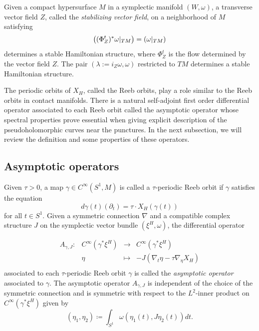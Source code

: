 \documentclass[11pt, a4paper]{amsart}
\let\ker\relax
\DeclareMathOperator{\ker}{Ker}
\begin{document}
\begin{example}\cite{HZ-Bookdynamics}\label{example: stabilizing vector field}
Given a compact hypersurface $M$ in a symplectic manifold $(W,\omega)$, a transverse vector field $Z$, called the \textit{stabilizing vector field}, on a neighborhood of $M$ satisfying
$$\ker \left((\Phi^t_Z)^*\omega|_{TM}\right)=\ker (\omega|_{TM}) $$
determines a stable Hamiltonian structure, where $\Phi^t_Z$ is the flow determined by the vector field $Z$. The pair $(\lambda:=i_{Z}\omega,\omega)$ restricted to $TM$ determines a stable Hamiltonian structure.
\end{example}

The periodic orbits of $X_H$, called the Reeb orbits, play a role similar to the Reeb orbits in contact manifolds. There is a natural self-adjoint first order differential operator associated to each Reeb orbit called the asymptotic operator whose spectral properties prove essential when giving explicit description of the pseudoholomorphic curves near the punctures. In the next subsection, we will review the definition and some properties of these operators.

\subsection{Asymptotic operators}\label{sec: Asymptotic operator}

Given $\tau>0$, a map $\gamma \in C^{\infty}(S^1 , M)$ is called a $\tau$-periodic Reeb orbit if $\gamma$ satisfies the equation $$d\gamma(t)(\partial_t) = \tau \cdot X_H (\gamma(t))$$ for all $t \in S^1$. Given a symmetric connection $\nabla$ and a compatible complex structure $J$ on the symplectic vector bundle $(\xi^{H},\omega)$, the differential operator 

\[\begin{array}{cccc}
      A_{\gamma,J}\colon & C^{\infty} (\gamma^*\xi^H) &\rightarrow &C^{\infty} (\gamma^*\xi^H)\\
       & \eta &\mapsto &-J(\nabla_t \eta - \tau \nabla_{\eta} X_H) \\
\end{array}\]
associated to each $\tau$-periodic Reeb orbit $\gamma$ is called the \textit{asymptotic operator} associated to $\gamma$. The asymptotic operator $A_{\gamma,J}$ is independent of the choice of the symmetric connection and is symmetric with respect to the $L^2$-inner product on $C^{\infty}(\gamma^*\xi^H)$ given by 
$$(\eta_1,\eta_2)\coloneqq \int_{S^{1}}\omega\left(\eta_1(t),J\eta_2(t)\right) dt.$$
\end{document}
